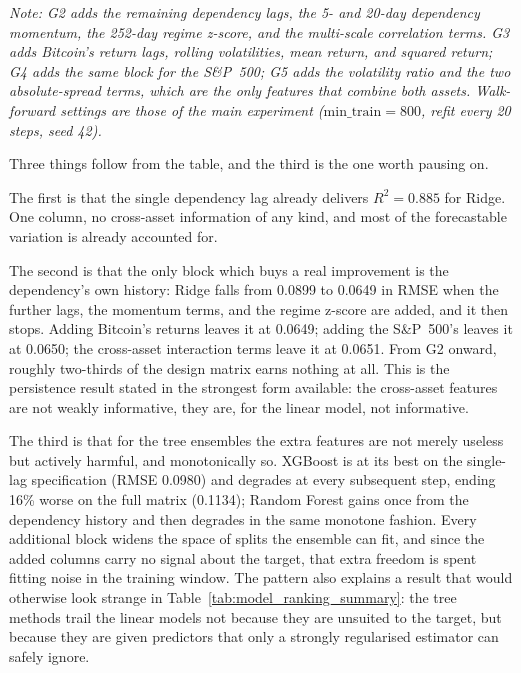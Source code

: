 \begin{table}[H]
    \centering
    \caption{Feature-group ablation, Bitcoin--S\&P~500 at $w = 30$. Each row adds a block of features to the row above and keeps everything before it; \# is the resulting number of columns in the design matrix.}
    \label{tab:feature_ablation}
    
    \par\smallskip\noindent\footnotesize{\textit{Note: G2 adds the remaining dependency lags, the 5- and 20-day dependency momentum, the 252-day regime z-score, and the multi-scale correlation terms. G3 adds Bitcoin's return lags, rolling volatilities, mean return, and squared return; G4 adds the same block for the S\&P~500; G5 adds the volatility ratio and the two absolute-spread terms, which are the only features that combine both assets. Walk-forward settings are those of the main experiment ($\mathrm{min\_train} = 800$, refit every 20 steps, seed 42).}}
\end{table}

Three things follow from the table, and the third is the one worth pausing on.

The first is that the single dependency lag already delivers $R^2 = 0.885$ for Ridge. One column, no cross-asset information of any kind, and most of the forecastable variation is already accounted for.

The second is that the only block which buys a real improvement is the dependency's own history: Ridge falls from 0.0899 to 0.0649 in RMSE when the further lags, the momentum terms, and the regime z-score are added, and it then stops. Adding Bitcoin's returns leaves it at 0.0649; adding the S\&P~500's leaves it at 0.0650; the cross-asset interaction terms leave it at 0.0651. From G2 onward, roughly two-thirds of the design matrix earns nothing at all. This is the persistence result stated in the strongest form available: the cross-asset features are not weakly informative, they are, for the linear model, not informative.

The third is that for the tree ensembles the extra features are not merely useless but actively harmful, and monotonically so. XGBoost is at its best on the single-lag specification (RMSE 0.0980) and degrades at every subsequent step, ending 16\% worse on the full matrix (0.1134); Random Forest gains once from the dependency history and then degrades in the same monotone fashion. Every additional block widens the space of splits the ensemble can fit, and since the added columns carry no signal about the target, that extra freedom is spent fitting noise in the training window. The pattern also explains a result that would otherwise look strange in Table~\ref{tab:model_ranking_summary}: the tree methods trail the linear models not because they are unsuited to the target, but because they are given predictors that only a strongly regularised estimator can safely ignore.


